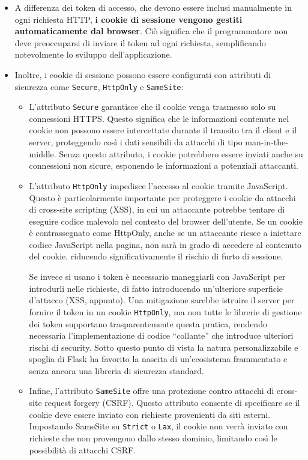 \begin{itemize}
    \item A differenza dei token di accesso, che devono essere inclusi manualmente in ogni richiesta HTTP, \textbf{i cookie di sessione vengono gestiti automaticamente dal browser}. Ciò significa che il programmatore non deve preoccuparsi di inviare il token ad ogni richiesta, semplificando notevolmente lo sviluppo dell'applicazione.
    \item Inoltre, i cookie di sessione possono essere configurati con attributi di sicurezza come \texttt{Secure}, \texttt{HttpOnly} e \texttt{SameSite}:
    \begin{itemize}
        \item L'attributo \texttt{Secure} garantisce che il cookie venga trasmesso solo su connessioni HTTPS. Questo significa che le informazioni contenute nel cookie non possono essere intercettate durante il transito tra il client e il server, proteggendo così i dati sensibili da attacchi di tipo man-in-the-middle. Senza questo attributo, i cookie potrebbero essere inviati anche su connessioni non sicure, esponendo le informazioni a potenziali attaccanti.
        \item L'attributo \texttt{HttpOnly} impedisce l'accesso al cookie tramite JavaScript. Questo è particolarmente importante per proteggere i cookie da attacchi di cross-site scripting (XSS), in cui un attaccante potrebbe tentare di eseguire codice malevolo nel contesto del browser dell'utente. Se un cookie è contrassegnato come HttpOnly, anche se un attaccante riesce a iniettare codice JavaScript nella pagina, non sarà in grado di accedere al contenuto del cookie, riducendo significativamente il rischio di furto di sessione.
        
        Se invece si usano i token è necessario maneggiarli con JavaScript per introdurli nelle richieste, di fatto introducendo un'ulteriore superficie d'attacco (XSS, appunto). Una mitigazione sarebbe istruire il server per fornire il token in un cookie \texttt{HttpOnly}, ma non tutte le librerie di gestione dei token supportano trasparentemente questa pratica, rendendo necessaria l'implementazione di codice ``collante'' che introduce ulteriori rischi di security. Sotto questo punto di vista la natura personalizzabile e spoglia di Flask ha favorito la nascita di un'ecosistema frammentato e senza ancora una libreria di sicurezza standard.
        \item Infine, l'attributo \texttt{SameSite} offre una protezione contro attacchi di cross-site request forgery (CSRF). Questo attributo consente di specificare se il cookie deve essere inviato con richieste provenienti da siti esterni. Impostando SameSite su \texttt{Strict} o \texttt{Lax}, il cookie non verrà inviato con richieste che non provengono dallo stesso dominio, limitando così le possibilità di attacchi CSRF.
        

\end{itemize}
\end{itemize}
